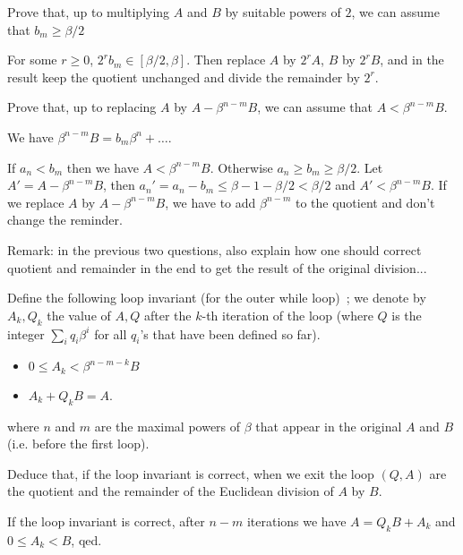 \documentclass[11pt]{exam}
\theoremstyle{definition}
\begin{document}
{\begin{questions}
\question Prove that, up to multiplying $A$ and $B$ by suitable
powers of $2$, we can assume that $b_{m} \geq \beta / 2$
\bigskip

\begin{solution}
For some $r \geq 0$, $2^r b_{m} \in [\beta/2, \beta]$.
Then replace $A$ by $2^r A$, $B$ by $2^r B$, and in the result keep
the quotient unchanged and divide the remainder by $2^r$. 
\end{solution}

\question Prove that, up to replacing $A$ by $A - \beta^{n-m}B$, we can
assume that $A < \beta^{n-m} B$.
\bigskip

\begin{solution}
We have $\beta^{n-m} B = b_m \beta^n + \dots$.

If $a_n < b_m$ then we have $A < \beta^{n-m} B$. Otherwise $a_n \geq b_m \geq \beta/2$. Let $A' = A - \beta^{n-m}B$, then $a_n' = a_n - b_m \leq \beta-1-\beta/2 < \beta/2$ and $A' < \beta^{n-m} B$.
If we replace $A$ by $A - \beta^{n-m} B$, we have to add $\beta^{n-m}$ to the quotient and don't change the reminder. 
\end{solution}

Remark: in the previous two questions, also explain how one should
  correct quotient and remainder in the end to get the result of the
  original division...
\bigskip

Define the following loop invariant (for the outer
while loop)~; we denote by $A_k, Q_k$ the value of $A, Q$ after the
$k$-th iteration of the loop (where $Q$ is the integer $\sum_i q_i \beta^i$ for all $q_i$'s that have been defined so far).
\begin{itemize}
\item $0\leq A_k < \beta^{n-m-k} B$
\item $A_k + Q_k B = A$. 
\end{itemize}
where $n$ and $m$ are the maximal powers of $\beta$ that appear in the original $A$ and $B$ (i.e. before the first loop).
\bigskip

\question Deduce that, if the loop invariant is correct, when we exit the
loop $(Q, A)$ are the quotient and the remainder of the Euclidean division
of $A$ by $B$.
\bigskip

\begin{solution}
If the loop invariant is correct, after $n-m$ iterations
we have $A = Q_k B + A_k$ and $0 \leq A_k < B$, qed. 
\end{solution}


\end{questions}}
\end{document}
